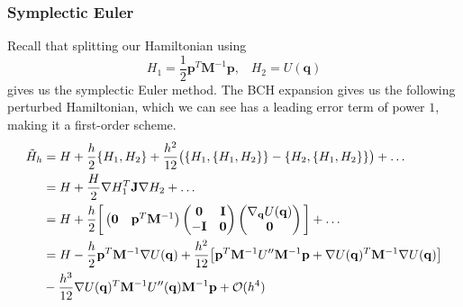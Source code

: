 \documentclass{article}
\theoremstyle{remark}
\theoremstyle{definition}
\begin{document}
\subsubsection{Symplectic Euler}
Recall that splitting our Hamiltonian using 
\[H_1 = \frac{1}{2} \mathbf{p}^T \mathbf{M}^{-1} \mathbf{p}, \;\;\; H_2 = U(\mathbf{q})\]
gives us the symplectic Euler method. The BCH expansion gives us the following perturbed Hamiltonian, which we can see has a leading error term of power $1$, making it a first-order scheme. 
\begin{align*}
    \Tilde{H}_h & = H + \frac{h}{2} \{H_1, H_2\} + \frac{h^2}{12} \big( \{H_1, \{H_1, H_2\}\} - \{ H_2, \{ H_1, H_2\}\} \big) + \ldots \\
    & = H + \frac{H}{2} \nabla H_1^T \mathbf{J} \nabla H_2 + \ldots \\
    & = H + \frac{h}{2} \bigg[ \begin{pmatrix} \mathbf{0} & \mathbf{p}^T \mathbf{M}^{-1} \end{pmatrix} \begin{pmatrix} \mathbf{0} & \mathbf{I} \\ -\mathbf{I} & \mathbf{0} \end{pmatrix} \begin{pmatrix} \nabla_\mathbf{q} U(\mathbf{q}) \\ \mathbf{0} \end{pmatrix} \bigg] + \ldots \\ 
    & = H - \frac{h}{2} \mathbf{p}^T \mathbf{M}^{-1} \nabla U(\mathbf{q}) + \frac{h^2}{12} \big[ \mathbf{p}^T \mathbf{M}^{-1} U^{\prime\prime} \mathbf{M}^{-1} \mathbf{p} + \nabla U(\mathbf{q})^T \mathbf{M}^{-1} \nabla U(\mathbf{q}) \big] \\
    & - \frac{h^3}{12} \nabla U (\mathbf{q})^T \mathbf{M}^{-1} U^{\prime\prime} (\mathbf{q}) \mathbf{M}^{-1} \mathbf{p} + \mathcal{O}(h^4)
\end{align*}
\end{document}
